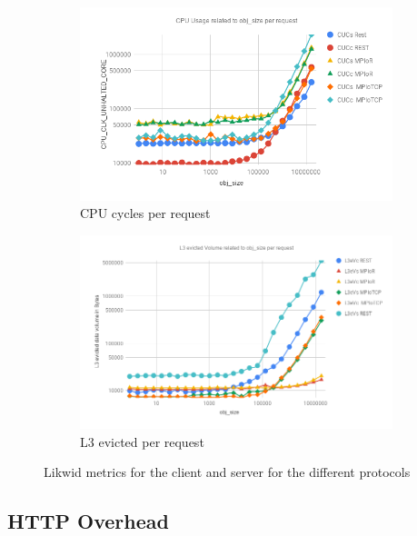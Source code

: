 \documentclass[runningheads]{llncs}
\begin{document}
\begin{figure}[!bt]
\centering
  \begin{subfigure}[t]{0.7\textwidth}
        \includegraphics[width=1\textwidth]{cpu-usage-rest-mpi.png}\vspace{-0.2em}
        \caption{CPU cycles per request}\vspace{-0.2em}
  \end{subfigure}
  \begin{subfigure}[t]{0.7\textwidth}
        \includegraphics[width=1\textwidth]{l3ev-rest-mpi.png}\vspace{-0.2em}
        \caption{L3 evicted per request}\vspace{-0.2em}
		\label{fig:l3ev-rest-mpi}
  \end{subfigure}

\caption{Likwid metrics for the client and server for the different protocols}
\end{figure}

\subsection{HTTP Overhead}
\end{document}
